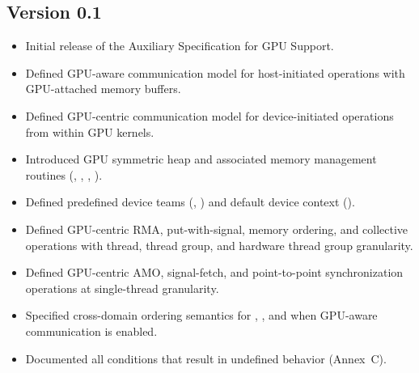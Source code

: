
\subsection*{Version 0.1}

\begin{itemize}
\item Initial release of the \openshmem Auxiliary Specification for GPU Support.
\item Defined GPU-aware communication model for host-initiated operations with
  GPU-attached memory buffers.
\item Defined GPU-centric communication model for device-initiated operations
  from within \ac{GPU} kernels.
\item Introduced \ac{GPU} symmetric heap and associated memory management
  routines (, , ,
  ).
\item Defined predefined device teams (,
  ) and default device context
  ().
\item Defined GPU-centric \ac{RMA}, put-with-signal, memory ordering, and
  collective operations with thread, thread group, and hardware thread group
  granularity.
\item Defined GPU-centric \ac{AMO}, signal-fetch, and point-to-point
  synchronization operations at single-thread granularity.
\item Specified cross-domain ordering semantics for ,
  , and  when GPU-aware communication
  is enabled.
\item Documented all conditions that result in undefined behavior (Annex~C).
\end{itemize}

\clearpage

